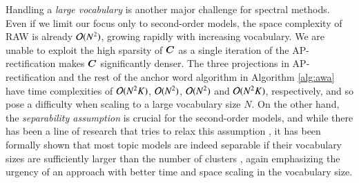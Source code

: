 Handling a \textit{large vocabulary} is another major challenge for spectral
methods. Even if we limit our focus only to second-order models, the space
complexity of RAW is already $\mathcal{O}(N^2)$, growing rapidly with increasing
vocabulary. We are unable to exploit the high sparsity of $\bm{C}$ as a single
iteration of the AP-rectification makes $\bm{C}$ significantly denser. The three
projections in AP-rectification and the rest of the anchor word algorithm in
Algorithm \ref{alg:awa} have time complexities of $\mathcal{O}(N^2 K)$, $\mathcal{O}(N^2)$,
$\mathcal{O}(N^2)$ and $\mathcal{O}(N^2 K)$, respectively, and so pose a difficulty when
scaling to a large vocabulary size $N$. On the other hand, the 
\textit{separability assumption} is crucial for the second-order models, and
while there has been a line of research that tries to relax this assumption 
\cite{bansal2014,huang2016}, it has been formally shown that most topic models
are indeed separable if their vocabulary sizes are sufficiently larger than the
number of clusters \cite{ding2015most}, again emphasizing the urgency of an
approach with better time and space scaling in the vocabulary size.
